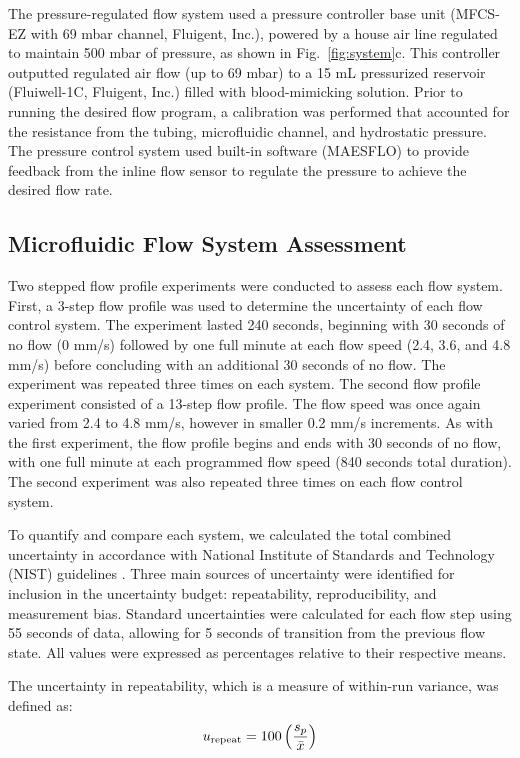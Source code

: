 \documentclass[12pt]{spieman}
\begin{document}
\begin{spacing}{2}
The pressure-regulated flow system used a pressure controller base unit (MFCS-EZ with 69 mbar channel, Fluigent, Inc.), powered by a house air line regulated to maintain 500 mbar of pressure, as shown in Fig.~\ref{fig:system}c. This controller outputted regulated air flow (up to 69 mbar) to a 15 mL pressurized reservoir (Fluiwell-1C, Fluigent, Inc.) filled with blood-mimicking solution. Prior to running the desired flow program, a calibration was performed that accounted for the resistance from the tubing, microfluidic channel, and hydrostatic pressure. The pressure control system used built-in software (MAESFLO) to provide feedback from the inline flow sensor to regulate the pressure to achieve the desired flow rate.


\subsection{Microfluidic Flow System Assessment}

Two stepped flow profile experiments were conducted to assess each flow system. First, a 3-step flow profile was used to determine the uncertainty of each flow control system. The experiment lasted 240 seconds, beginning with 30 seconds of no flow (0 mm/s) followed by one full minute at each flow speed (2.4, 3.6, and 4.8 mm/s) before concluding with an additional 30 seconds of no flow. The experiment was repeated three times on each system. The second flow profile experiment consisted of a 13-step flow profile. The flow speed was once again varied from 2.4 to 4.8 mm/s, however in smaller 0.2 mm/s increments. As with the first experiment, the flow profile begins and ends with 30 seconds of no flow, with one full minute at each programmed flow speed (840 seconds total duration). The second experiment was also repeated three times on each flow control system.

To quantify and compare each system, we calculated the total combined uncertainty in accordance with National Institute of Standards and Technology (NIST) guidelines \cite{Taylor.199438,NIST:2002}. Three main sources of uncertainty were identified for inclusion in the uncertainty budget: repeatability, reproducibility, and measurement bias. Standard uncertainties were calculated for each flow step using 55 seconds of data, allowing for 5 seconds of transition from the previous flow state. All values were expressed as percentages relative to their respective means.

The uncertainty in repeatability, which is a measure of within-run variance, was defined as:
%
\begin{equation}
    \label{eq:u_repeat}
    u_\textnormal{repeat} = 100\left(\frac{s_p}{\bar{x}}\right)
\end{equation}


\end{spacing}
\end{document}
